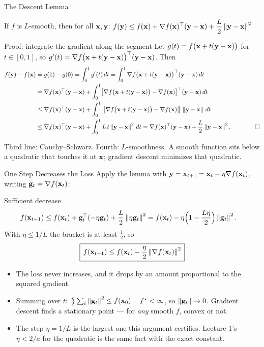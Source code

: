 \documentclass[11pt,aspectratio=169]{beamer}
\begin{document}
\begin{frame}{The Descent Lemma}\footnotesize
\begin{claim}{If $f$ is $L$-smooth, then for all $\mathbf{x},\mathbf{y}$:\quad
$f(\mathbf{y})\le f(\mathbf{x})+\nabla f(\mathbf{x})^{\top}(\mathbf{y}-\mathbf{x})+\dfrac L2\left\lVert \mathbf{y}-\mathbf{x} \right\rVert^2$}
\end{claim}
\begin{derivation}{Proof: integrate the gradient along the segment}
Let $g(t)=f\bigl(\mathbf{x}+t(\mathbf{y}-\mathbf{x})\bigr)$ for $t\in[0,1]$, so $g'(t)=\nabla f\bigl(\mathbf{x}+t(\mathbf{y}-\mathbf{x})\bigr)^{\top}(\mathbf{y}-\mathbf{x})$. Then
\begin{align*}
f(\mathbf{y})-f(\mathbf{x})&=g(1)-g(0)=\int_0^1 g'(t)\,dt
=\int_0^1\nabla f\bigl(\mathbf{x}+t(\mathbf{y}-\mathbf{x})\bigr)^{\top}(\mathbf{y}-\mathbf{x})\,dt\\
&=\nabla f(\mathbf{x})^{\top}(\mathbf{y}-\mathbf{x})+\int_0^1\bigl[\nabla f\bigl(\mathbf{x}+t(\mathbf{y}-\mathbf{x})\bigr)-\nabla f(\mathbf{x})\bigr]^{\top}(\mathbf{y}-\mathbf{x})\,dt\\
&\le\nabla f(\mathbf{x})^{\top}(\mathbf{y}-\mathbf{x})+\int_0^1\left\lVert \nabla f\bigl(\mathbf{x}+t(\mathbf{y}-\mathbf{x})\bigr)-\nabla f(\mathbf{x}) \right\rVert\,\left\lVert \mathbf{y}-\mathbf{x} \right\rVert\,dt
\\
&\le\nabla f(\mathbf{x})^{\top}(\mathbf{y}-\mathbf{x})+\int_0^1 L\,t\left\lVert \mathbf{y}-\mathbf{x} \right\rVert^2\,dt
=\nabla f(\mathbf{x})^{\top}(\mathbf{y}-\mathbf{x})+\frac L2\left\lVert \mathbf{y}-\mathbf{x} \right\rVert^2 .
\qquad\qed
\end{align*}
\end{derivation}
Third line: Cauchy--Schwarz. Fourth: $L$-smoothness. A smooth function sits below a quadratic that touches it at $\mathbf{x}$; gradient descent minimizes that quadratic.
\end{frame}

\begin{frame}{One Step Decreases the Loss}\small
Apply the lemma with $\mathbf{y}=\mathbf{x}_{t+1}=\mathbf{x}_t-\eta\nabla f(\mathbf{x}_t)$, writing $\mathbf{g}_t=\nabla f(\mathbf{x}_t)$:
\begin{derivation}{Sufficient decrease}
\begin{align*}
f(\mathbf{x}_{t+1})&\le f(\mathbf{x}_t)+\mathbf{g}_t^{\top}(-\eta\mathbf{g}_t)+\frac L2\left\lVert \eta\mathbf{g}_t \right\rVert^2
=f(\mathbf{x}_t)-\eta\Bigl(1-\frac{L\eta}{2}\Bigr)\left\lVert \mathbf{g}_t \right\rVert^2 .
\end{align*}
With $\eta\le 1/L$ the bracket is at least $\tfrac12$, so
\[
\boxed{\,f(\mathbf{x}_{t+1})\le f(\mathbf{x}_t)-\frac\eta2\left\lVert \nabla f(\mathbf{x}_t) \right\rVert^2\,}
\]
\end{derivation}
\begin{itemize}
  \item The loss never increases, and it drops by an amount proportional to the squared gradient.
  \item Summing over $t$: $\tfrac\eta2\sum_t\left\lVert \mathbf{g}_t \right\rVert^2\le f(\mathbf{x}_0)-f^\star<\infty$, so $\left\lVert \mathbf{g}_t \right\rVert\to0$.
        Gradient descent finds a stationary point --- for \emph{any} smooth $f$, convex or not.
  \item The step $\eta=1/L$ is the largest one this argument certifies. Lecture 1's $\eta<2/a$ for the
        quadratic is the same fact with the exact constant.
\end{itemize}
\end{frame}
\end{document}
